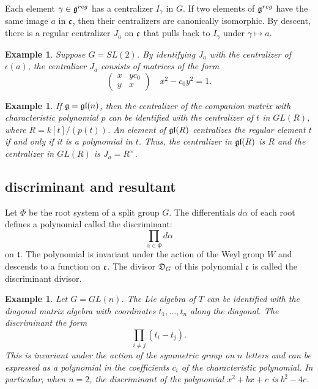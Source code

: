 \documentclass[brochure,english,12pt]{bourbaki}
\newtheorem{example}[equation]{Example}
\def\gl{\frak{gl}}
\def\g{\frak{g}}
\def\t{\frak{t}}
\def\cc{\frak{c}}
\def\DIV{{\frak{D}}}
\begin{document}
Each element $\gamma\in\g^{reg}$ has a centralizer $I_\gamma$ in $G$.  If two
elements of $\g^{reg}$ have the same image $a$ in $\cc$, then their
centralizers are canonically isomorphic.  By descent, there is a
regular centralizer $J_a$ on $\cc$ that pulls back to $I_\gamma$ under
$\gamma\mapsto a$.



\begin{example}  Suppose $G=SL(2)$.  By identifying $J_a$ with the centralizer of
  $\epsilon(a)$, the centralizer $J_a$ consists of
  matrices of the form
\[
\begin{pmatrix} x & y c_0\\ y & x
\end{pmatrix}
\quad x^2 - c_0 y^2 = 1.
\]
\end{example}

\begin{example}
  If $\g=\gl(n)$, then the centralizer of the companion matrix with
  characteristic polynomial $p$ can be identified with the centralizer
  of $t$ in $GL(R)$, where $R=k[t]/(p(t))$.  An
  element of $\gl(R)$ centralizes the regular element $t$ if and only if it is a polynomial
  in $t$.  Thus, the centralizer in $\gl(R)$ is $R$ and the centralizer in $GL(R)$
 is $J_a = R^\times$.
\end{example}


\subsection{discriminant and resultant}

Let $\Phi$ be the root system of a split group $G$.  The differentials $d\alpha$ of each
root defines a  polynomial called the discriminant:
\begin{equation}\label{eqn:disc}
\prod_{\alpha\in\Phi} d\alpha
\end{equation}
on $\t$.  The polynomial is invariant under the action of the Weyl group 
$W$ and descends to a function on $\cc$.
The divisor $\DIV_G$ of this polynomial $\cc$ is called the discriminant divisor.

\begin{example} Let $G=GL(n)$.  The Lie algebra of $T$ can be identified with the diagonal matrix
algebra with coordinates $t_1,\ldots,t_n$ along the diagonal.  The discriminant the form
\[\prod_{i\ne j} (t_i - t_j).\]
This  is invariant under the action of the symmetric group on $n$ letters 
and can be expressed as a polynomial in the coefficients $c_i$ of the characteristic polynomial.
In particular, when $n=2$, the discriminant of the polynomial $x^2 + b x + c$ is $b^2 - 4 c$.
\end{example}
\end{document}
